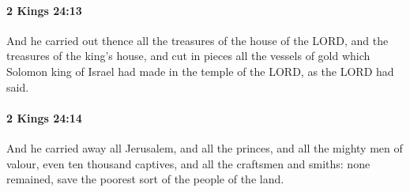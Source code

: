 		\paragraph{2 Kings 24:13} %
			\label{2KINGS-24-13}

			And he carried out thence all the treasures of the house of the LORD, and the treasures of the king’s house, and cut in pieces all the vessels of gold which Solomon king of Israel had made in the temple of the LORD, as the LORD had said.


		\paragraph{2 Kings 24:14} %
			\label{2KINGS-24-14}

			And he carried away all Jerusalem, and all the princes, and all the mighty men of valour, even ten thousand captives, and all the craftsmen and smiths: none remained, save the poorest sort of the people of the land.

